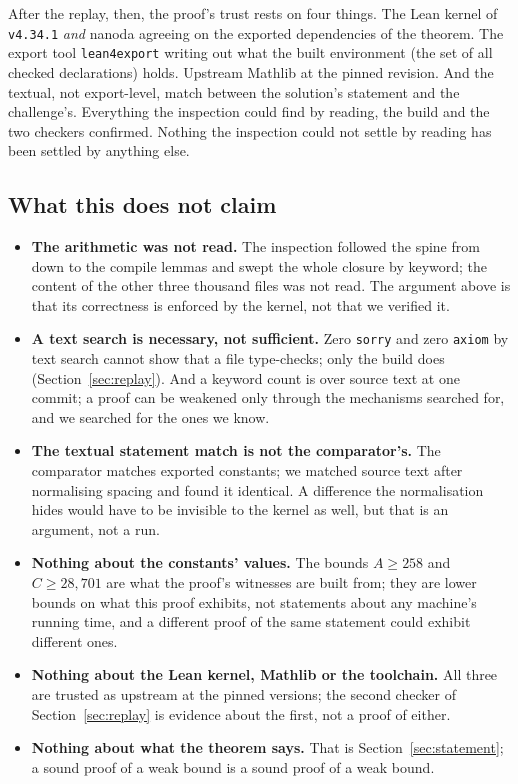 After the replay, then, the proof's trust rests on four things. The
Lean kernel of \texttt{v4.34.1} \emph{and} nanoda agreeing on the
exported dependencies of the theorem. The export tool
\texttt{lean4export} writing out what the built environment (the set of
all checked declarations) holds. Upstream Mathlib at the pinned revision.
And the textual, not export-level, match between the solution's statement
and the challenge's. Everything the
inspection could find by reading, the build and the two checkers
confirmed. Nothing the inspection could not settle by reading has been
settled by anything else.

\subsection{What this does not claim}
\label{sec:proof-not}

\begin{itemize}
\item \textbf{The arithmetic was not read.} The inspection followed the
  spine from  down to the compile
  lemmas and swept the whole closure by keyword; the content of the
  other three thousand files was not read. The argument above is that
  its correctness is enforced by the kernel, not that we verified it.
\item \textbf{A text search is necessary, not sufficient.} Zero
  \texttt{sorry} and zero \texttt{axiom} by text search cannot show that
  a file type-checks; only the build does (Section~\ref{sec:replay}).
  And a keyword count is over source text at one commit; a proof can be
  weakened only through the mechanisms searched for, and we searched for
  the ones we know.
\item \textbf{The textual statement match is not the comparator's.} The
  comparator matches exported constants; we matched source text after
  normalising spacing and found it identical. A difference the
  normalisation hides would have to be invisible to the kernel as well,
  but that is an argument, not a run.
\item \textbf{Nothing about the constants' values.} The bounds
  $A \ge 258$ and $C \ge 28{,}701$ are what the proof's witnesses are
  built from; they are lower bounds on what this proof exhibits, not
  statements about any machine's running time, and a different proof of
  the same statement could exhibit different ones.
\item \textbf{Nothing about the Lean kernel, Mathlib or the toolchain.}
  All three are trusted as upstream at the pinned versions; the second
  checker of Section~\ref{sec:replay} is evidence about the first, not a
  proof of either.
\item \textbf{Nothing about what the theorem says.} That is
  Section~\ref{sec:statement}; a sound proof of a weak bound is a sound
  proof of a weak bound.
\end{itemize}
\par\endgroup
